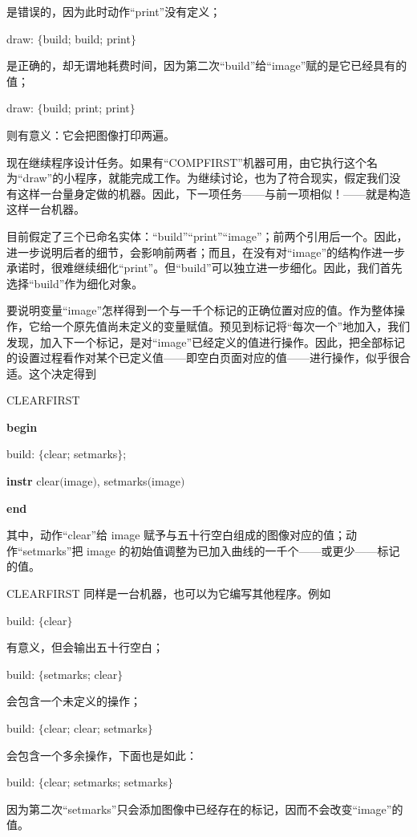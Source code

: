 \documentclass[twoside,11pt,fontset=none]{ctexbook}
\begin{document}
\noindent
是错误的，因为此时动作“print”没有定义；

draw: $\{$build; build; print$\}$

\noindent
是正确的，却无谓地耗费时间，因为第二次“build”给“image”赋的是它已经具有的值；

draw: $\{$build; print; print$\}$

\noindent
则有意义：它会把图像打印两遍。

现在继续程序设计任务。如果有“COMPFIRST”机器可用，由它执行这个名为“draw”的小程序，就能完成工作。为继续讨论，也为了符合现实，假定我们没有这样一台量身定做的机器。因此，下一项任务——与前一项相似！——就是构造这样一台机器。

目前假定了三个已命名实体：“build”“print”“image”；前两个引用后一个。因此，进一步说明后者的细节，会影响前两者；而且，在没有对“image”的结构作进一步承诺时，很难继续细化“print”。但“build”可以独立进一步细化。因此，我们首先选择“build”作为细化对象。

要说明变量“image”怎样得到一个与一千个标记的正确位置对应的值。作为整体操作，它给一个原先值尚未定义的变量赋值。预见到标记将“每次一个”地加入，我们发现，加入下一个标记，是对“image”已经定义的值进行操作。因此，把全部标记的设置过程看作对某个已定义值——即空白页面对应的值——进行操作，似乎很合适。这个决定得到

CLEARFIRST

\textbf{begin}

\quad build: $\{$clear; setmarks$\}$;

\quad \textbf{instr} clear$($image$)$, setmarks$($image$)$

\textbf{end}

\noindent
其中，动作“clear”给 image 赋予与五十行空白组成的图像对应的值；动作“setmarks”把 image 的初始值调整为已加入曲线的一千个——或更少——标记的值。

CLEARFIRST 同样是一台机器，也可以为它编写其他程序。例如

build: $\{$clear$\}$

\noindent
有意义，但会输出五十行空白；

build: $\{$setmarks; clear$\}$

\noindent
会包含一个未定义的操作；

build: $\{$clear; clear; setmarks$\}$

\noindent
会包含一个多余操作，下面也是如此：

build: $\{$clear; setmarks; setmarks$\}$

\noindent
因为第二次“setmarks”只会添加图像中已经存在的标记，因而不会改变“image”的值。
\end{document}
